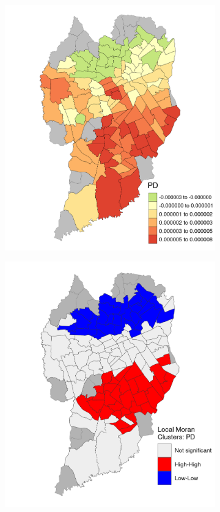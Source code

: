 \begin{figure}[!htbp]
    \centering\footnotesize
    \captionsetup{font=footnotesize}
    \caption{PD COEFFICIENT ESTIMATES}
    \begin{subfigure}{0.5\textwidth}
        \includegraphics{fig/PD.png}
    \end{subfigure}%
    \begin{subfigure}{0.5\textwidth}
        \includegraphics{fig/lisa_PD.png}

\end{subfigure}
\end{figure}
